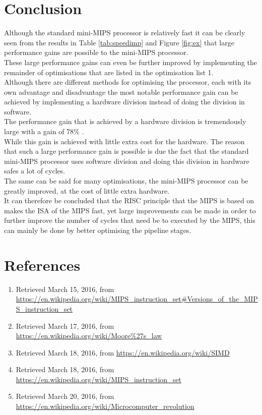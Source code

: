 \documentclass[10pt]{article}
\begin{document}
\section{Conclusion}
Although the standard mini-MIPS processor is relatively fast it can be clearly seen from the results in Table \ref{tab:speedimp} and Figure \ref{fig:ex} that large performance gains are possible to the mini-MIPS processor.\\
These large performance gains can even be further improved by implementing the remainder of optimisations that are listed in the optimisation list 1.\\ %
Although there are different methods for optimising the processor, each with its own advantage and disadvantage the most notable performance gain can be achieved by implementing a hardware division instead of doing the division in software.\\
The performance gain that is achieved by a hardware division is tremendously large with a gain of 78\% .\\
While this gain is achieved with little extra cost for the hardware. The reason that such a large performance gain is possible is due the fact that the standard mini-MIPS processor uses software division and doing this division in hardware safes a lot of cycles.\\
The same can be said for many optimisations, the mini-MIPS processor can be greatly improved, at the cost of little extra hardware.\\
It can therefore be concluded that the RISC principle that the MIPS is based on makes the ISA of the MIPS fast,  yet large improvements can be made in order to further improve the number of cycles that need be to executed by the MIPS, this can mainly be done by better optimising the pipeline stages.

\section{References}

\begin{enumerate}

\item Retrieved March 15, 2016, from  \url{https://en.wikipedia.org/wiki/MIPS_instruction_set#Versions_of_the_MIPS_instruction_set }

\item Retrieved March 17, 2016, from \url{https://en.wikipedia.org/wiki/Moore%27s_law }

\item Retrieved March 18, 2016, from \url{https://en.wikipedia.org/wiki/SIMD }

\item Retrieved March 18, 2016, from \url{https://en.wikipedia.org/wiki/MIPS_instruction_set }

\item Retrieved March 20, 2016, from \url{https://en.wikipedia.org/wiki/Microcomputer_revolution }


\end{enumerate}
\end{document}
